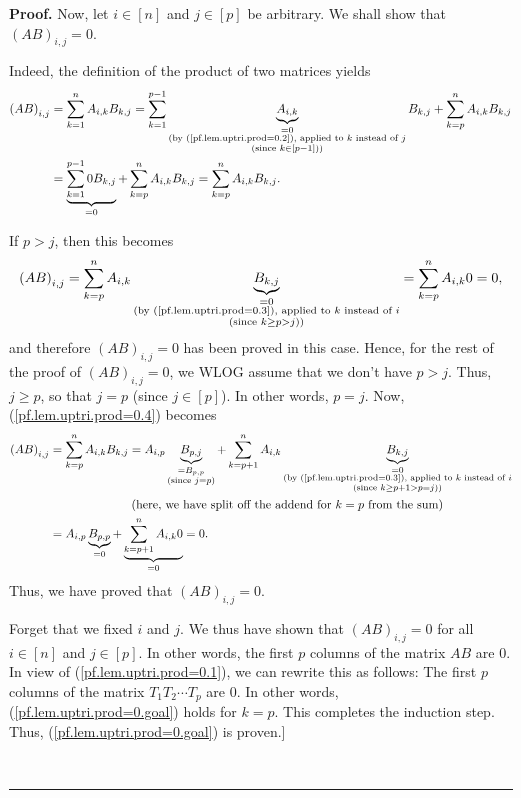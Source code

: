 \documentclass[numbers=enddot,12pt,final,onecolumn,notitlepage]{scrartcl}%
\numberwithin{exer}{subsection}
\theoremstyle{definition}
\newenvironment{proof}[1][Proof]{\noindent\textbf{#1.} }{\ \rule{0.5em}{0.5em}}
\let\sumnonlimits\sum
\renewcommand{\sum}{\sumnonlimits\limits}
\begin{document}
\begin{proof}
Now, let $i\in\left[  n\right]  $ and $j\in\left[  p\right]  $ be arbitrary.
We shall show that $\left(  AB\right)  _{i,j}=0$.

Indeed, the definition of the product of two matrices yields%
\begin{align}
\left(  AB\right)  _{i,j}  &  =\sum_{k=1}^{n}A_{i,k}B_{k,j}=\sum_{k=1}%
^{p-1}\underbrace{A_{i,k}}_{\substack{=0\\\text{(by
(\ref{pf.lem.uptri.prod=0.2}), applied to }k\text{ instead of }j\\\text{(since
}k\in\left[  p-1\right]  \text{))}}}B_{k,j}+\sum_{k=p}^{n}A_{i,k}%
B_{k,j}\nonumber\\
&  =\underbrace{\sum_{k=1}^{p-1}0B_{k,j}}_{=0}+\sum_{k=p}^{n}A_{i,k}%
B_{k,j}=\sum_{k=p}^{n}A_{i,k}B_{k,j}. \label{pf.lem.uptri.prod=0.4}%
\end{align}


If $p>j$, then this becomes%
\[
\left(  AB\right)  _{i,j}=\sum_{k=p}^{n}A_{i,k}\underbrace{B_{k,j}%
}_{\substack{=0\\\text{(by (\ref{pf.lem.uptri.prod=0.3}), applied to }k\text{
instead of }i\\\text{(since }k\geq p>j\text{))}}}=\sum_{k=p}^{n}A_{i,k}0=0,
\]
and therefore $\left(  AB\right)  _{i,j}=0$ has been proved in this case.
Hence, for the rest of the proof of $\left(  AB\right)  _{i,j}=0$, we WLOG
assume that we don't have $p>j$. Thus, $j\geq p$, so that $j=p$ (since
$j\in\left[  p\right]  $). In other words, $p=j$. Now,
(\ref{pf.lem.uptri.prod=0.4}) becomes%
\begin{align*}
\left(  AB\right)  _{i,j}  &  =\sum_{k=p}^{n}A_{i,k}B_{k,j}=A_{i,p}%
\underbrace{B_{p,j}}_{\substack{=B_{p,p}\\\text{(since }j=p\text{)}}%
}+\sum_{k=p+1}^{n}A_{i,k}\underbrace{B_{k,j}}_{\substack{=0\\\text{(by
(\ref{pf.lem.uptri.prod=0.3}), applied to }k\text{ instead of }i\\\text{(since
}k\geq p+1>p=j\text{))}}}\\
&  \ \ \ \ \ \ \ \ \ \ \ \ \ \ \ \ \ \ \ \ \left(  \text{here, we have split
off the addend for }k=p\text{ from the sum}\right) \\
&  =A_{i,p}\underbrace{B_{p,p}}_{=0}+\underbrace{\sum_{k=p+1}^{n}A_{i,k}%
0}_{=0}=0.
\end{align*}
Thus, we have proved that $\left(  AB\right)  _{i,j}=0$.

Forget that we fixed $i$ and $j$. We thus have shown that $\left(  AB\right)
_{i,j}=0$ for all $i\in\left[  n\right]  $ and $j\in\left[  p\right]  $. In
other words, the first $p$ columns of the matrix $AB$ are $0$. In view of
(\ref{pf.lem.uptri.prod=0.1}), we can rewrite this as follows: The first $p$
columns of the matrix $T_{1}T_{2}\cdots T_{p}$ are $0$. In other words,
(\ref{pf.lem.uptri.prod=0.goal}) holds for $k=p$. This completes the induction
step. Thus, (\ref{pf.lem.uptri.prod=0.goal}) is proven.] \medskip


\end{proof}
\end{document}
